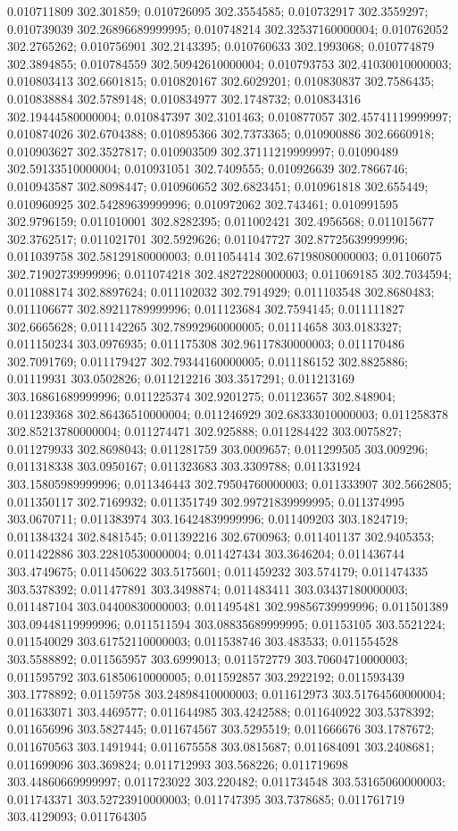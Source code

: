 0.010711809 302.301859; 0.010726095 302.3554585; 0.010732917 302.3559297; 0.010739039 302.26896689999995; 0.010748214 302.32537160000004; 0.010762052 302.2765262; 0.010756901 302.2143395; 0.010760633 302.1993068; 0.010774879 302.3894855; 0.010784559 302.50942610000004; 0.010793753 302.41030010000003; 0.010803413 302.6601815; 0.010820167 302.6029201; 0.010830837 302.7586435; 0.010838884 302.5789148; 0.010834977 302.1748732; 0.010834316 302.19444580000004; 0.010847397 302.3101463; 0.010877057 302.45741119999997; 0.010874026 302.6704388; 0.010895366 302.7373365; 0.010900886 302.6660918; 0.010903627 302.3527817; 0.010903509 302.37111219999997; 0.01090489 302.59133510000004; 0.010931051 302.7409555; 0.010926639 302.7866746; 0.010943587 302.8098447; 0.010960652 302.6823451; 0.010961818 302.655449; 0.010960925 302.54289639999996; 0.010972062 302.743461; 0.010991595 302.9796159; 0.011010001 302.8282395; 0.011002421 302.4956568; 0.011015677 302.3762517; 0.011021701 302.5929626; 0.011047727 302.87725639999996; 0.011039758 302.58129180000003; 0.011054414 302.67198080000003; 0.01106075 302.71902739999996; 0.011074218 302.48272280000003; 0.011069185 302.7034594; 0.011088174 302.8897624; 0.011102032 302.7914929; 0.011103548 302.8680483; 0.011106677 302.89211789999996; 0.011123684 302.7594145; 0.011111827 302.6665628; 0.011142265 302.78992960000005; 0.01114658 303.0183327; 0.011150234 303.0976935; 0.011175308 302.96117830000003; 0.011170486 302.7091769; 0.011179427 302.79344160000005; 0.011186152 302.8825886; 0.01119931 303.0502826; 0.011212216 303.3517291; 0.011213169 303.16861689999996; 0.011225374 302.9201275; 0.01123657 302.848904; 0.011239368 302.86436510000004; 0.011246929 302.68333010000003; 0.011258378 302.85213780000004; 0.011274471 302.925888; 0.011284422 303.0075827; 0.011279933 302.8698043; 0.011281759 303.0009657; 0.011299505 303.009296; 0.011318338 303.0950167; 0.011323683 303.3309788; 0.011331924 303.15805989999996; 0.011346443 302.79504760000003; 0.011333907 302.5662805; 0.011350117 302.7169932; 0.011351749 302.99721839999995; 0.011374995 303.0670711; 0.011383974 303.16424839999996; 0.011409203 303.1824719; 0.011384324 302.8481545; 0.011392216 302.6700963; 0.011401137 302.9405353; 0.011422886 303.22810530000004; 0.011427434 303.3646204; 0.011436744 303.4749675; 0.011450622 303.5175601; 0.011459232 303.574179; 0.011474335 303.5378392; 0.011477891 303.3498874; 0.011483411 303.03437180000003; 0.011487104 303.04400830000003; 0.011495481 302.99856739999996; 0.011501389 303.09448119999996; 0.011511594 303.08835689999995; 0.01153105 303.5521224; 0.011540029 303.61752110000003; 0.011538746 303.483533; 0.011554528 303.5588892; 0.011565957 303.6999013; 0.011572779 303.70604710000003; 0.011595792 303.61850610000005; 0.011592857 303.2922192; 0.011593439 303.1778892; 0.01159758 303.24898410000003; 0.011612973 303.51764560000004; 0.011633071 303.4469577; 0.011644985 303.4242588; 0.011640922 303.5378392; 0.011656996 303.5827445; 0.011674567 303.5295519; 0.011666676 303.1787672; 0.011670563 303.1491944; 0.011675558 303.0815687; 0.011684091 303.2408681; 0.011699096 303.369824; 0.011712993 303.568226; 0.011719698 303.44860669999997; 0.011723022 303.220482; 0.011734548 303.53165060000003; 0.011743371 303.52723910000003; 0.011747395 303.7378685; 0.011761719 303.4129093; 0.011764305 